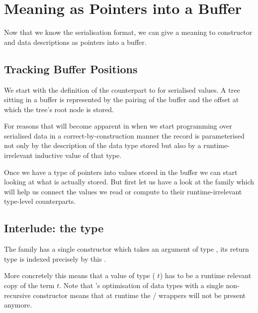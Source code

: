 \section{Meaning as Pointers into a Buffer}\label{sec:pointers}

Now that we know the serialisation format, we can give a meaning
to constructor and data descriptions as pointers into a buffer.

\subsection{Tracking Buffer Positions}

We start with the definition of the counterpart to 
for serialised values. A tree sitting in a buffer is represented
by the pairing of the buffer and the offset at which the tree's
root node is stored.


For reasons that will become apparent in 
when we start programming over serialised data in a correct-by-construction
manner the record  is parameterised not only by the description
of the data type stored but also by a runtime-irrelevant inductive value of
that type.


Once we have a type of pointers into values stored in the buffer
we can start looking at what is actually stored.
%
But first let us have a look at the  family
which will help us connect the values we read or compute to their
runtime-irrelevant type-level counterparts.

\subsection{Interlude: the  type}\label{sec:datasingleton}

The  family has a single constructor
which takes an argument  of type ,
its return type is indexed precisely by this .


More concretely this means that a value of type
( $t$) has to be a runtime relevant
copy of the term $t$.
%
Note that \idris{}'s optimisation of data types with a single
non-recursive constructor means that at runtime the
 /  wrappers
will not be present anymore.


